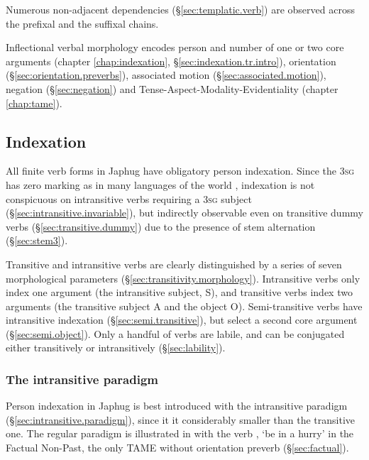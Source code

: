  Numerous non-adjacent dependencies (§\ref{sec:templatic.verb}) are observed across the prefixal and the suffixal chains.
 
Inflectional verbal morphology encodes person and number of one or two core arguments (chapter \ref{chap:indexation}, §\ref{sec:indexation.tr.intro}), orientation (§\ref{sec:orientation.preverbs}), associated motion (§\ref{sec:associated.motion}), negation (§\ref{sec:negation}) and Tense-Aspect-Modality-Evidentiality (chapter \ref{chap:tame}). 
 
 
\subsection{Indexation} \label{sec:indexation.intro}
All finite verb forms in Japhug have obligatory person indexation. Since the \textsc{3sg} has zero marking as in many languages of the world \citep[227--236]{benveniste66problemes1}, indexation is not conspicuous on intransitive verbs requiring a \textsc{3sg} subject (§\ref{sec:intransitive.invariable}), but indirectly observable even on transitive dummy verbs (§\ref{sec:transitive.dummy}) due to the presence of stem alternation (§\ref{sec:stem3}).

Transitive and intransitive verbs are clearly distinguished by a series of seven morphological parameters (§\ref{sec:transitivity.morphology}). Intransitive verbs only index one argument (the intransitive subject, S), and transitive verbs index two arguments (the transitive subject A and the object O). Semi-transitive verbs have intransitive indexation (§\ref{sec:semi.transitive}), but select a second core argument (§\ref{sec:semi.object}). Only a handful of verbs are labile, and can be conjugated either transitively or intransitively (§\ref{sec:lability}).

\subsubsection{The intransitive paradigm}
Person indexation in Japhug is best introduced with the intransitive paradigm (§\ref{sec:intransitive.paradigm}), since it it considerably smaller than the transitive one. The regular paradigm is illustrated in  with the verb ,  `be in a hurry' in the Factual Non-Past, the only TAME without orientation preverb (§\ref{sec:factual}).
 
